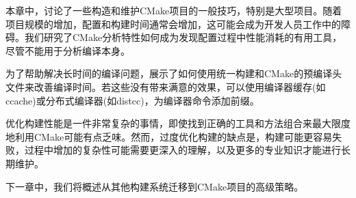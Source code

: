 本章中，讨论了一些构造和维护CMake项目的一般技巧，特别是大型项目。随着项目规模的增加，配置和构建时间通常会增加，这可能会成为开发人员工作中的障碍。我们研究了CMake分析特性如何成为发现配置过程中性能消耗的有用工具，尽管不能用于分析编译本身。

为了帮助解决长时间的编译问题，展示了如何使用统一构建和CMake的预编译头文件来改善编译时间。若这些没有带来满意的效果，可以使用编译器缓存(如ccache)或分布式编译器(如distcc)，为编译器命令添加前缀。

优化构建性能是一件非常复杂的事情，即使找到正确的工具和方法组合来最大限度地利用CMake可能有点乏味。然而，过度优化构建的缺点是，构建可能更容易失败，过程中增加的复杂性可能需要更深入的理解，以及更多的专业知识才能进行长期维护。

下一章中，我们将概述从其他构建系统迁移到CMake项目的高级策略。